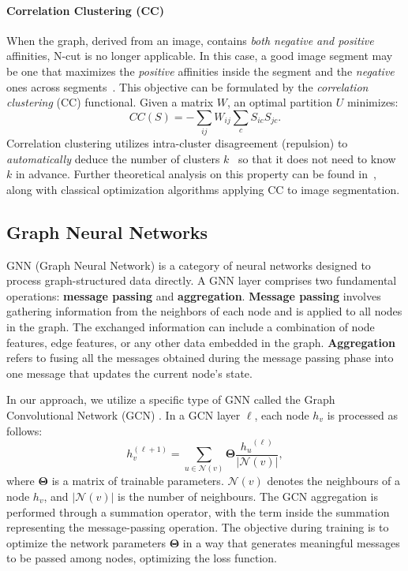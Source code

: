 \documentclass[10pt,twocolumn,letterpaper]{article}
\begin{document}
\paragraph{Correlation Clustering (CC)~\cite{bansal2004correlation}}
When the graph, derived from an image, contains \emph{both negative and positive} affinities, N-cut is no longer applicable. 
In this case, a good image segment may be one that maximizes the \emph{positive} affinities inside the segment and the \emph{negative} ones across segments~\cite{bansal2004correlation}. 
This objective can be formulated by the \emph{correlation clustering} (CC) functional. 
Given a matrix $W$, an optimal partition $U$ minimizes:
\begin{equation}
CC(S) = - \sum_{ij}W_{ij} \sum_{c} S_{ic}S_{jc}.
 \label{eq:jj}
\end{equation}
Correlation clustering utilizes intra-cluster disagreement (repulsion) to \emph{automatically} deduce the number of clusters $k$~\cite{bansal2004correlation}  so that it does not need to know $k$ in advance. Further theoretical analysis on this property can be found in~\cite{bagon2011large}, along with classical optimization algorithms applying CC to image segmentation.


\subsection{Graph Neural Networks}
GNN (Graph Neural Network) is a category of neural networks designed to process graph-structured data directly. A GNN layer comprises two fundamental operations: \textbf{message passing} and \textbf{aggregation}.
\textbf{Message passing} involves gathering information from the neighbors of each node and is applied to all nodes in the graph. The exchanged information can include a combination of node features, edge features, or any other data embedded in the graph.
\textbf{Aggregation} refers to fusing all the messages obtained during the message passing phase into one message that updates the current node's state.

In our approach, we utilize a specific type of GNN called the Graph Convolutional Network (GCN) \cite{kipf2016semi}. In a GCN layer $\ell$, each node $h_v$ is processed as follows:
\begin{equation}
{h}_v^{(\ell+1)} = \sum_{u\in \mathcal{N}(v)} \mathbf{\Theta} \frac{{h_u}^{(\ell)}}{|\mathcal{N}(v)|},
  \label{eq:gcn}
 \end{equation}
 where $\mathbf{\Theta}$ is a matrix of trainable parameters. $\mathcal{N}(v)$ denotes the neighbours of a node $h_v$, and $|\mathcal{N}(v)|$ is the number of neighbours. The GCN aggregation is performed through a summation operator, with the term inside the summation representing the message-passing operation. The objective during training is to optimize the network parameters $\mathbf{\Theta}$ in a way that generates meaningful messages to be passed among nodes, optimizing the loss function.
\end{document}
